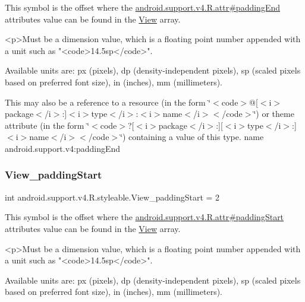 This symbol is the offset where the \hyperlink{classandroid_1_1support_1_1v4_1_1R_1_1attr_a16d2d8f352681074b9a4bcedf9a6bb01}{android.\+support.\+v4.\+R.\+attr\#padding\+End} attribute\textquotesingle{}s value can be found in the \hyperlink{classandroid_1_1support_1_1v4_1_1R_1_1styleable_a165672be2496e8f1adf1b075bb5fe74f}{View} array.

\begin{DoxyVerb}      <p>Must be a dimension value, which is a floating point number appended with a unit such as "<code>14.5sp</code>".
\end{DoxyVerb}
 Available units are\+: px (pixels), dp (density-\/independent pixels), sp (scaled pixels based on preferred font size), in (inches), mm (millimeters). 

This may also be a reference to a resource (in the form \char`\"{}$<$code$>$@\mbox{[}$<$i$>$package$<$/i$>$\+:\mbox{]}$<$i$>$type$<$/i$>$\+:$<$i$>$name$<$/i$>$$<$/code$>$\char`\"{}) or theme attribute (in the form \char`\"{}$<$code$>$?\mbox{[}$<$i$>$package$<$/i$>$\+:\mbox{]}\mbox{[}$<$i$>$type$<$/i$>$\+:\mbox{]}$<$i$>$name$<$/i$>$$<$/code$>$\char`\"{}) containing a value of this type.  name android.\+support.\+v4\+:padding\+End \mbox{\label{classandroid_1_1support_1_1v4_1_1R_1_1styleable_a8672f9bf1c5d1bbaf3c499fd347a58a7}} 
\subsubsection{\texorpdfstring{View\+\_\+padding\+Start}{View\_paddingStart}}
{\footnotesize\ttfamily int android.\+support.\+v4.\+R.\+styleable.\+View\+\_\+padding\+Start = 2\hspace{0.3cm}{\ttfamily [static]}}

This symbol is the offset where the \hyperlink{classandroid_1_1support_1_1v4_1_1R_1_1attr_a43901dbed7432f76b991b19a0d9d2c3f}{android.\+support.\+v4.\+R.\+attr\#padding\+Start} attribute\textquotesingle{}s value can be found in the \hyperlink{classandroid_1_1support_1_1v4_1_1R_1_1styleable_a165672be2496e8f1adf1b075bb5fe74f}{View} array.

\begin{DoxyVerb}      <p>Must be a dimension value, which is a floating point number appended with a unit such as "<code>14.5sp</code>".
\end{DoxyVerb}
 Available units are\+: px (pixels), dp (density-\/independent pixels), sp (scaled pixels based on preferred font size), in (inches), mm (millimeters). 

